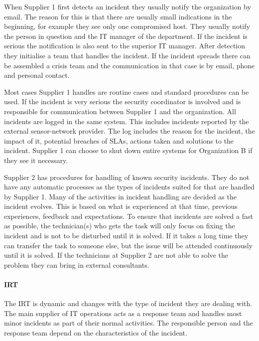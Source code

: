 When Supplier 1 first detects an incident they usually notify the organization by email. The reason for this is that there are usually small indications in the beginning, for example they see only one compromised host. They usually notify the person in question and the IT manager of the department. If the incident is serious the notification is also sent to the superior IT manager. After detection they initialise a team that handles the incident. If the incident spreads there can be assembled a crisis team and the communication in that case is by email, phone and personal contact. 

Most cases Supplier 1 handles are routine cases and standard procedures can be used. If the incident is very serious the security coordinator is involved and is responsible for communication between Supplier 1 and the organization. All incidents are logged in the same system. This includes incidents reported by the external sensor-network provider. The log includes the reason for the incident, the impact of it, potential breaches of \acp{SLA}, actions taken and solutions to the incident. Supplier 1 can choose to shut down entire systems for Organization B if they see it necessary.

Supplier 2 has procedures for handling of known security incidents. They do not have any automatic processes as the types of incidents suited for that are handled by Supplier 1. Many of the activities in incident handling are decided as the incident evolves. This is based on what is experienced at that time, previous experiences, feedback and expectations. To ensure that incidents are solved a fast as possible, the technician(s) who gets the task will only focus on fixing the incident and is not to be disturbed until it is solved. If it takes a long time they can transfer the task to someone else, but the issue will be attended continuously until it is solved. If the technicians at Supplier 2 are not able to solve the problem they can bring in external consultants.

\paragraph{\acl{IRT}}
The \ac{IRT} is dynamic and changes with the type of incident they are dealing with. The main supplier of IT operations acts as a response team and handles most minor incidents as part of their normal activities. The responsible person and the response team depend on the characteristics of the incident.   

